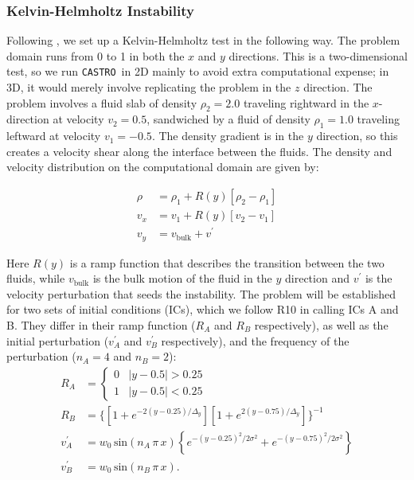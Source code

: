 \documentclass[iop]{../emulateapj}
\newcommand{\castro}{\texttt{CASTRO}}
\begin{document}
\subsubsection{Kelvin-Helmholtz Instability}\label{sec:khi}

Following \cite{robertson:2010}, we set up a Kelvin-Helmholtz test in
the following way. The problem domain runs from 0 to 1 in both the $x$
and $y$ directions. This is a two-dimensional test, so we run
\castro\ in 2D mainly to avoid extra computational expense; in 3D, it 
would merely involve replicating the problem in the $z$ direction.
The problem involves a fluid slab of density $\rho_2 = 2.0$ traveling rightward in the
$x$-direction at velocity $v_2 = 0.5$, sandwiched by a fluid of
density $\rho_1 = 1.0$ traveling leftward at velocity $v_1 =
-0.5$. The density gradient is in the $y$ direction, so this creates a
velocity shear along the interface between the fluids. The density and
velocity distribution on the computational domain are given by:

\begin{align}
  \rho &= \rho_1 + R(y)\left[\rho_2 - \rho_1\right] \\
  v_x  &= v_1 + R(y)\left[v_2 - v_1\right] \\
  v_y  &= v_{\text{bulk}} + v^\prime
\end{align}

Here $R(y)$ is a ramp function that describes the transition between
the two fluids, while $v_{\text{bulk}}$ is the bulk motion of the
fluid in the $y$ direction and $v^\prime$ is the velocity perturbation
that seeds the instability. The problem will be established for two
sets of initial conditions (ICs), which we follow
R10 in calling ICs A and B. They differ in
their ramp function ($R_A$ and $R_B$ respectively), as well as the
initial perturbation ($v^\prime_A$ and $v^\prime_B$ respectively), and
the frequency of the perturbation ($n_A = 4$ and $n_B = 2$):
\begin{align}
  R_A &= \begin{cases} 0 & |y - 0.5| > 0.25 \\ 1 & |y - 0.5| < 0.25 \end{cases} \label{eq:kh_ic_a_ramp}\\
  R_B &= \Big\{\left[1 + e^{-2(y-0.25)/\Delta_y}\right]\left[1 + e^{2(y-0.75)/\Delta_y}\right]\Big\}^{-1} \label{eq:kh_ic_b_ramp}\\
  v^\prime_A &= w_0\, \text{sin}\left(n_A\, \pi\, x\right) \left\{e^{-(y-0.25)^2 / 2\sigma^2} + e^{-(y-0.75)^2/2\sigma^2}\right\} \label{eq:kh_ic_a}\\
  v^\prime_B &= w_0\, \text{sin}\left(n_B\, \pi\, x\right). \label{eq:kh_ic_b}
\end{align}
\end{document}
